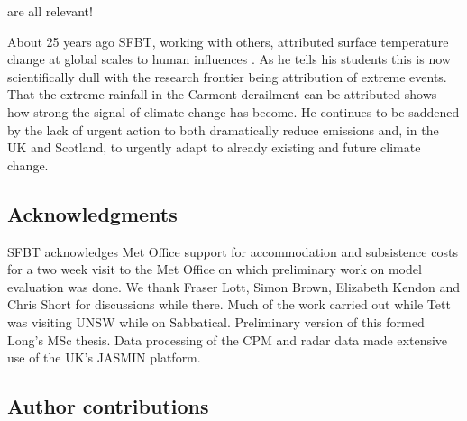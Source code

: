 \documentclass[11pt,a4paper]{article}
\begin{document}
\cite{saltikoff2019radar_climate,kendon2021ukclimate,karoly06cet,harrison2000nimrod,kendon2023uk_climate} are all relevant! 

About 25 years ago SFBT, working with others, attributed surface temperature  change at global scales to human influences \parencite{tett99c20tc,stott00sci}. As he tells his students this is now scientifically dull with the research frontier being attribution of extreme  events. That the extreme rainfall in the Carmont derailment can be attributed shows how strong the signal of climate change has become.  He continues to be saddened by the lack of urgent action to both dramatically reduce emissions and, in the UK and Scotland, to urgently adapt to already existing and future climate change\parencite{ccc2024no_action}.

\printbibliography %

\subsection*{Acknowledgments}
SFBT acknowledges  Met Office support for accommodation and subsistence costs for a two week visit to the Met Office on which preliminary work on model evaluation was done. We thank Fraser Lott, Simon Brown, Elizabeth Kendon and Chris Short for discussions while there. Much of the  work carried out while Tett was visiting UNSW while on Sabbatical. Preliminary version of this formed Long's MSc thesis. Data processing of the CPM and radar data made extensive use of the UK's JASMIN platform. 

\subsection*{Author contributions}

\clearpage





\clearpage
\end{document}
